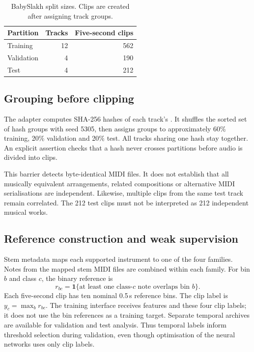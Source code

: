 \documentclass[10pt,a4paper]{article}
\newcommand{\code}[1]{\texttt{\detokenize{#1}}}
\begin{document}
\begin{table}[htbp]
\centering
\caption{BabySlakh split sizes. Clips are created after assigning track groups.}
\label{tab:split}
\begin{tabular}{lrr}\toprule
Partition & Tracks & Five-second clips\\\midrule
Training & 12 & 562\\
Validation & 4 & 190\\
Test & 4 & 212\\\bottomrule
\end{tabular}
\end{table}

\subsection{Grouping before clipping}
The adapter computes SHA-256 hashes of each track's \code{all_src.mid}. It shuffles the sorted set of hash groups with seed 5305, then assigns groups to approximately 60\% training, 20\% validation and 20\% test. All tracks sharing one hash stay together. An explicit assertion checks that a hash never crosses partitions before audio is divided into clips.

This barrier detects byte-identical MIDI files. It does not establish that all musically equivalent arrangements, related compositions or alternative MIDI serialisations are independent. Likewise, multiple clips from the same test track remain correlated. The 212 test clips must not be interpreted as 212 independent musical works.

\subsection{Reference construction and weak supervision}
Stem metadata maps each supported instrument to one of the four families. Notes from the mapped stem MIDI files are combined within each family. For bin $b$ and class $c$, the binary reference is
\begin{equation}
r_{bc}=\mathbf{1}\{\text{at least one class-$c$ note overlaps bin $b$}\}.
\end{equation}
Each five-second clip has ten nominal 0.5\,s reference bins. The clip label is $y_c=\max_b r_{bc}$. The training interface receives features and these four clip labels; it does not use the bin references as a training target. Separate temporal archives are available for validation and test analysis. Thus temporal labels inform threshold selection during validation, even though optimisation of the neural networks uses only clip labels.
\end{document}
